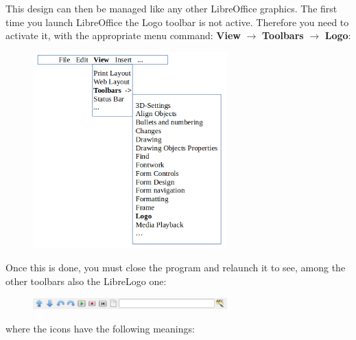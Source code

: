 This design can then be managed  like any other LibreOffice graphics. The first time you launch LibreOffice the Logo toolbar is not active. Therefore you need to activate it, with the appropriate menu command: \textbf{View} $\rightarrow$ \textbf{Toolbars} $\rightarrow$ \textbf{Logo}: 

\begin{figure}[h]
   \centering
   \includegraphics[width=7.5cm]{./images/librelogo/AttivazioneToolbar.png}
   \label{AttivazioneToolbar}
\end{figure}

Once this is done, you must close the program and relaunch it to see, among the other toolbars also the LibreLogo one: 

\begin{figure}[h]
   \centering
   \includegraphics[width=7.5cm]{./images/librelogo/LibreLogoToolbar.png}
   \label{LibreLogoToolbar}
\end{figure}

where the icons have the following meanings:

